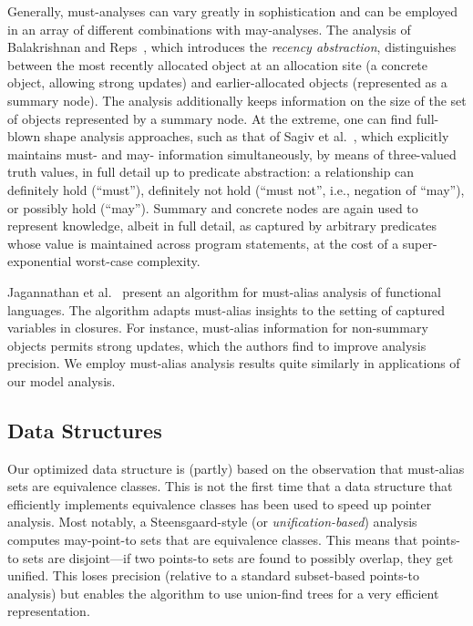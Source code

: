 Generally, must-analyses can vary greatly in sophistication and can be employed in an array of different combinations with may-analyses. The analysis of Balakrishnan and Reps~\cite{sas:2006:Balakrishnan}, which introduces the \emph{recency abstraction}, distinguishes between the most recently allocated object at an allocation site (a concrete object, allowing strong updates) and earlier-allocated objects (represented as a summary node). The analysis additionally keeps information on the size of the set of objects represented by a summary node. At the extreme, one can find full-blown shape analysis approaches, such as that of Sagiv et al.~\cite{article:2002:Sagiv}, which explicitly maintains must- and may- information simultaneously, by means of three-valued truth values, in full detail up to predicate abstraction: a relationship can definitely hold (``must''), definitely not hold (``must not'', i.e., negation of ``may''), or possibly hold (``may''). Summary and concrete nodes are again used to represent knowledge, albeit in full detail, as captured by arbitrary predicates whose value is maintained across program statements, at the cost of a super-exponential worst-case complexity.

Jagannathan et al.~\cite{popl:1998:Jagannathan} present an algorithm for must-alias analysis of functional languages. The algorithm adapts must-alias insights to the setting of captured variables in closures. For instance, must-alias information for non-summary objects permits strong updates, which the authors find to improve analysis precision. We employ must-alias analysis results quite similarly in applications of our model analysis.


\subsection*{Data Structures}

Our optimized data structure is (partly) based on the observation that must-alias sets are equivalence classes. This is not the first time that a data structure that efficiently implements equivalence classes has been used to speed up pointer analysis. Most notably, a Steensgaard-style (or \emph{unification-based}) \cite{popl:1996:Steensgaard} analysis computes may-point-to sets that are equivalence classes. This means that points-to sets are disjoint---if two points-to sets are found to possibly overlap, they get unified. This loses precision (relative to a standard subset-based points-to analysis) but enables the algorithm to use union-find trees for a very efficient representation.

